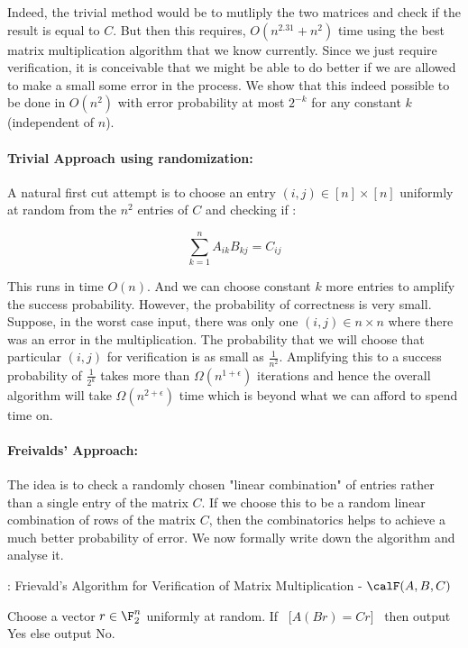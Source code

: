 Indeed, the trivial method would be to mutliply the two matrices and check if the result is equal to $C$. But then this requires, $O(n^{2.31}+n^2)$ time using the best matrix multiplication algorithm that we know currently. Since we just require verification, it is conceivable that we might be able to do better if we are allowed to make a small some error in the process.
We show that this indeed possible to be done in $O(n^2)$ with error probability at most $2^{-k}$ for any constant $k$ (independent of $n$).

\paragraph{Trivial Approach using randomization:} A natural first cut attempt is to choose an entry $(i,j)\in [n] \times [n]$ uniformly at random from the $n^2$ entries of $C$ and checking if :

$$ \sum_{k=1}^n A_{ik}B_{kj} = C_{ij}$$

\noindent This runs in time $O(n)$. And we can choose constant $k$ more entries to amplify the success probability. However, the probability of correctness is very small. Suppose, in the worst case input, there was only one $(i,j) \in n \times n$ where there was an error in the multiplication. The probability that we will choose that particular $(i,j)$ for verification is as small as $\frac{1}{n^2}$. Amplifying this to a success probability of $\frac{1}{2^k}$ takes more than $\Omega(n^{1+\epsilon})$ iterations and hence the overall algorithm will take $\Omega(n^{2+\epsilon})$ time which is beyond what we can afford to spend time on.

\paragraph{Freivalds' Approach:} The idea is to check a randomly chosen "linear combination" of entries rather than a single entry of the matrix $C$. If we choose this to be a random linear combination of rows of the matrix $C$, then the combinatorics helps to achieve a much better probability of error. We now formally write down the algorithm and analyse it.

\begin{algorithm}%
\label{alg:frievalds-algo}
\caption{: Frievald's Algorithm for Verification of Matrix Multiplication - ${\calF}(A,B,C)$}
\begin{algorithmic}[1]
\State Choose a vector $r \in \F_2^n$ uniformly at random.
\State If ~[$A(Br) = Cr$]~ then output {\sc Yes} else output {\sc No}.
\end{algorithmic}
\end{algorithm}

